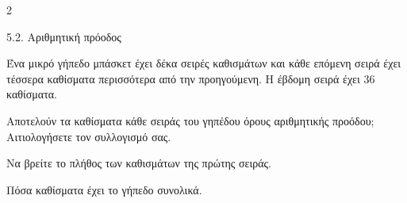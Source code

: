 \begin{ylh}{2}
    \item 5.2. Αριθμητική πρόοδος
\end{ylh}
Ένα μικρό γήπεδο μπάσκετ έχει δέκα σειρές καθισμάτων και κάθε επόμενη σειρά έχει τέσσερα καθίσματα περισσότερα από την προηγούμενη. Η έβδομη σειρά έχει 36 καθίσματα.
\begin{alist}
\item Αποτελούν τα καθίσματα κάθε σειράς του γηπέδου όρους αριθμητικής προόδου; Αιτιολογήσετε τον συλλογισμό σας.
\item Να βρείτε το πλήθος των καθισμάτων της πρώτης σειράς.
\item Πόσα καθίσματα έχει το γήπεδο συνολικά.
\end{alist}

